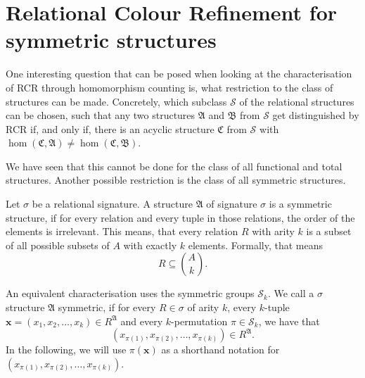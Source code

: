 \section {Relational Colour Refinement for symmetric structures}
\label{sec:RelationalColourRefinementForSymmetricStructures}

One interesting question that can be posed when looking at the characterisation of RCR through homomorphism counting is, what restriction to the class of structures can be made.
Concretely, which subclass $\mathcal S$ of the relational structures can be chosen, such that any two structures $\mathfrak A$ and $\mathfrak B$ from $\mathcal S$ get distinguished by RCR if, and only if, there is an acyclic structure $\mathfrak C$ from $\mathcal S$ with $\hom(\mathfrak C, \mathfrak A)\neq \hom(\mathfrak C, \mathfrak B)$.

We have seen that this cannot be done for the class of all functional and total structures.
Another possible restriction is the class of all symmetric structures.

\begin{definition}
	Let $\sigma$ be a relational signature.
	A structure $\mathfrak A$ of signature $\sigma$ is a symmetric structure, if for every relation and every tuple in those relations, the order of the elements is irrelevant.
	This means, that every relation $R$ with arity $k$ is a subset of all possible subsets of $A$ with exactly $k$ elements.
	Formally, that means
	$$R\subseteq \binom{A}{k}.$$
\end{definition}
An equivalent characterisation uses the symmetric groups $\mathcal S_k$.
We call a $\sigma$ structure $\mathfrak A$ symmetric, if for every $R\in \sigma$ of arity $k$, every $k$-tuple $\mathbf x=(x_1,x_2,\dots,x_k)\in R^{\mathfrak A}$ and every $k$-permutation $\pi\in \mathcal S_k$, we have that
$$(x_{\pi(1)},x_{\pi(2)},\dots,x_{\pi(k)})\in R^{\mathfrak A}.$$
In the following, we will use $\pi(\mathbf x)$ as a shorthand notation for $(x_{\pi(1)},x_{\pi(2)},\dots,x_{\pi(k)})$.

